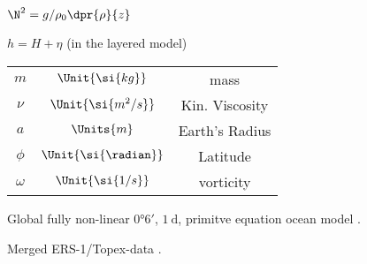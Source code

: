 \begin{fullwidth}
\begin{multicols}{2}
\begin{definition}
\end{definition}
\begin{definition}\label{def:eta}
\end{definition}
\begin{definition}\label{def:H}
\end{definition}
\begin{definition}\label{def:BVf}
$\N^2=g/\rho_0 \dpr{\rho}{z}$
\end{definition}
\begin{definition}\label{def:h}
$h = H+\eta$ (in the layered model)
\end{definition}
\begin{definition}\label{def:physpar}
\centering
{
\begin{tabular}{ccc}
$m$         & $\Unit{\si{kg}}$            & mass           \\
$\nu$       & $\Unit{\si{m^{2}/s}}$				& Kin. Viscosity \\
$a$			    & $\Units{m}$         				& Earth's Radius \\
$\phi$	    & $\Unit{\si{\radian}}$     	& 	Latitude   	 \\
$\omega$    & $\Unit{\si{1/s}}$						& 		vorticity  
\end{tabular} 
}
\end{definition}

\begin{definition}\label{def:POP}
Global fully non-linear $\ang{0;6;}$, $\SI{1}{\day}$,
primitve equation ocean model \citep{Oestreicher}.
\end{definition}
\begin{definition}\label{def:AVISO}
Merged ERS-1/Topex-data \citep{Forget2010}.
\end{definition}



\end{multicols}
\end{fullwidth}
